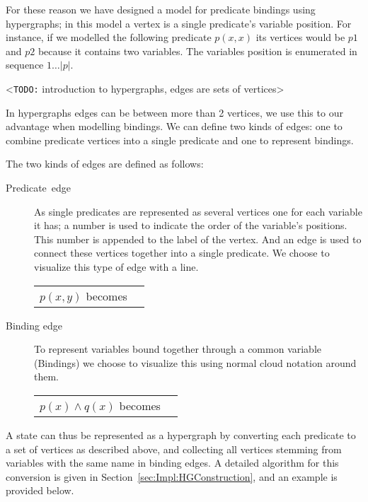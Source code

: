 \documentclass[../Master.tex]{subfiles}
\begin{document}
	For these reason we have designed a model for predicate bindings using hypergraphs;
	in this	model a vertex is a single predicate's variable position.
	For instance, if we modelled the following predicate $p(x,x)$ its vertices would be $p1$ and $p2$ because it contains two variables.
	The variables position is enumerated in sequence $1\ldots |p|$.

	<\texttt{TODO:} introduction to hypergraphs, edges are sets of vertices>

	In hypergraphs edges can be between more than 2 vertices, we use this to our advantage when modelling bindings.
	We can define two kinds of edges: one to combine predicate vertices into a single predicate and one to represent bindings.

	The two kinds of edges are defined as follows:


	\begin{description}
		\item [{Predicate~edge}] As  single predicates are represented as several vertices one for each variable
		it has; a number is used to indicate the order of the variable's
		positions. This number is appended to the label of the vertex. And an edge is used to connect these vertices together into a single predicate.
		We choose to visualize this type of edge with a line.\\
		\begin{tabular}{c  c}

			$p(x, y)$ becomes &
            \raisebox{-.5\height}{\resizebox{0.16\linewidth}{!}{}}
		\end{tabular}
		\item[{Binding edge}] To represent variables bound together through a common variable (Bindings) we
		choose to visualize this using normal cloud notation around them.\\
		\begin{tabular}{c  c}

			$p(x) \land q(x)$ becomes &
            \raisebox{-.5\height}{\resizebox{0.2\linewidth}{!}{}}
		\end{tabular}
	\end{description}

    A state can thus be represented as a hypergraph by converting each predicate to a set of vertices as described above, and collecting all vertices stemming from variables with the same name in binding edges. A detailed algorithm for this conversion is given in Section~\ref{sec:Impl:HGConstruction}, and an example is provided below.
\end{document}
